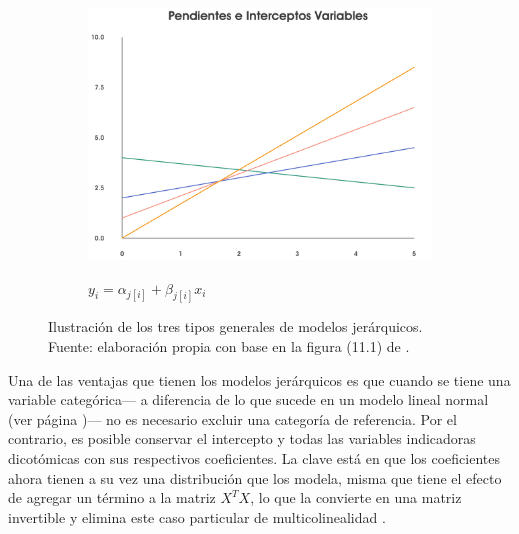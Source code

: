 \begin{figure}[h]
\begin{subfigure}{0.3\textwidth}
        \includegraphics[width=\textwidth]{Figs/Bayes/Pend_e_Inter_Variables}
        \label{fig:Ejemplos_Jer_Pend_Int_Var}
        \caption{$y_i = \alpha_{j[i]} + \beta_{j[i]} x_i$}
    \end{subfigure}
    \caption{Ilustración de los tres tipos generales de modelos jerárquicos. Fuente: elaboración propia con base en la figura (11.1) de \textcite{GelmanHill06}.}\label{fig:Ejemplos_Jer}
\end{figure}

Una de las ventajas que tienen los modelos jerárquicos es que cuando se tiene una variable categórica--- a diferencia de lo que sucede en un modelo lineal normal (ver página \pageref{prob_multicolinealidad})--- no es necesario excluir una categoría de referencia. Por el contrario, es posible conservar el intercepto y todas las variables indicadoras dicotómicas con sus respectivos coeficientes. La clave está en que los coeficientes ahora tienen a su vez una distribución que los modela, misma que tiene el efecto de agregar un término a la matriz $X^TX$, lo que la convierte en una matriz invertible y elimina este caso particular de multicolinealidad \parencite{GelmanHill06}. 

